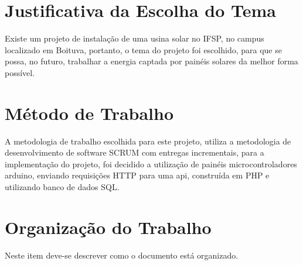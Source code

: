 \section{Justificativa da Escolha do Tema}

Existe um projeto de instalação de uma usina solar no IFSP, no campus localizado em Boituva, portanto, o tema do projeto foi escolhido, para que se possa, no futuro, trabalhar a energia captada por painéis solares da melhor forma possível.

\section{Método de Trabalho}

A metodologia de trabalho escolhida para este projeto, utiliza a metodologia de desenvolvimento de software SCRUM com entregas incrementais, para a implementação do projeto, foi decidido a utilização de painéis microcontroladores arduino, enviando requisições HTTP para uma api, construída em PHP e utilizando banco de dados SQL.

\section{Organização do Trabalho}

Neste item deve-se descrever como o documento está organizado.

